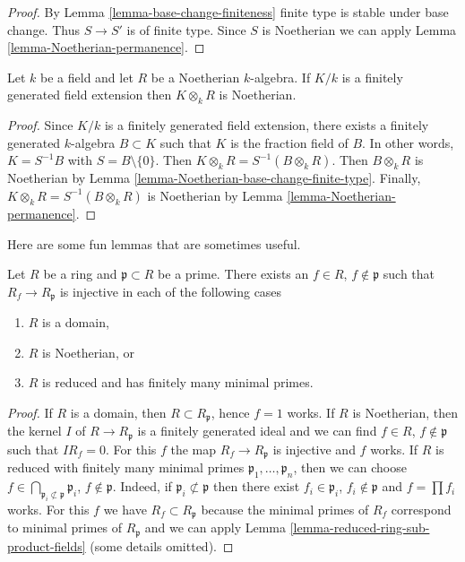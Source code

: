 \begin{proof}
By Lemma \ref{lemma-base-change-finiteness} finite type is stable under
base change. Thus $S \to S'$ is of finite type. Since $S$ is Noetherian we
can apply Lemma \ref{lemma-Noetherian-permanence}.
\end{proof}

\begin{lemma}
\label{lemma-Noetherian-field-extension}
Let $k$ be a field and let $R$ be a Noetherian $k$-algebra.
If $K/k$ is a finitely generated field extension then
$K \otimes_k R$ is Noetherian.
\end{lemma}

\begin{proof}
Since $K/k$ is a finitely generated field extension, there exists
a finitely generated $k$-algebra $B \subset K$ such that $K$ is
the fraction field of $B$. In other words, $K = S^{-1}B$
with $S = B \setminus \{0\}$. Then $K \otimes_k R = S^{-1}(B \otimes_k R)$.
Then $B \otimes_k R$ is Noetherian by
Lemma \ref{lemma-Noetherian-base-change-finite-type}.
Finally, $K \otimes_k R = S^{-1}(B \otimes_k R)$ is Noetherian by
Lemma \ref{lemma-Noetherian-permanence}.
\end{proof}

\noindent
Here are some fun lemmas that are sometimes useful.

\begin{lemma}
\label{lemma-subring-of-local-ring}
Let $R$ be a ring and $\mathfrak p \subset R$ be a prime.
There exists an $f \in R$, $f \not \in \mathfrak p$ such
that $R_f \to R_\mathfrak p$ is injective in each of the
following cases
\begin{enumerate}
\item $R$ is a domain,
\item $R$ is Noetherian, or
\item $R$ is reduced and has finitely many minimal primes.
\end{enumerate}
\end{lemma}

\begin{proof}
If $R$ is a domain, then $R \subset R_\mathfrak p$, hence $f = 1$ works.
If $R$ is Noetherian, then the kernel $I$ of $R \to R_\mathfrak p$
is a finitely generated ideal and we can find
$f \in R$, $f \not \in \mathfrak p$ such that $IR_f = 0$.
For this $f$ the map $R_f \to R_\mathfrak p$ is injective
and $f$ works. If $R$ is reduced with finitely
many minimal primes $\mathfrak p_1, \ldots, \mathfrak p_n$,
then we can choose
$f \in \bigcap_{\mathfrak p_i \not \subset \mathfrak p} \mathfrak p_i$,
$f \not \in \mathfrak p$. Indeed, if $\mathfrak{p}_i\not\subset
\mathfrak{p}$ then there exist $f_i \in \mathfrak{p}_i$,
$f_i \not\in \mathfrak{p}$ and $f = \prod f_i$ works.
For this $f$ we have $R_f \subset R_\mathfrak p$ because the minimal
primes of $R_f$ correspond to minimal primes of $R_\mathfrak p$
and we can apply Lemma \ref{lemma-reduced-ring-sub-product-fields}
(some details omitted).
\end{proof}

